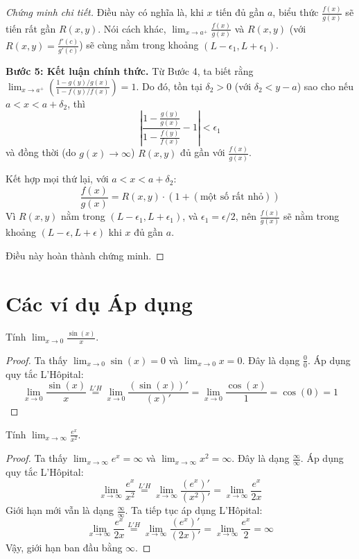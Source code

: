 \begin{proof}[Chứng minh chi tiết]
Điều này có nghĩa là, khi $x$ tiến đủ gần $a$, biểu thức $\frac{f(x)}{g(x)}$ sẽ tiến rất gần $R(x, y)$.
Nói cách khác, $\lim_{x \to a^+} \frac{f(x)}{g(x)}$ và $R(x, y)$ (với $R(x, y) = \frac{f'(c)}{g'(c)}$) sẽ cùng nằm trong khoảng $(L - \epsilon_1, L + \epsilon_1)$.

\textbf{Bước 5: Kết luận chính thức.}
Từ Bước 4, ta biết rằng $\lim_{x \to a^+} \left( \frac{1 - g(y)/g(x)}{1 - f(y)/f(x)} \right) = 1$.
Do đó, tồn tại $\delta_2 > 0$ (với $\delta_2 < y - a$) sao cho nếu $a < x < a + \delta_2$, thì
$$ \left| \frac{1 - \frac{g(y)}{g(x)}}{1 - \frac{f(y)}{f(x)}} - 1 \right| < \epsilon_1 $$
và đồng thời (do $g(x) \to \infty$) $R(x, y)$ đủ gần với $\frac{f(x)}{g(x)}$.

Kết hợp mọi thứ lại, với $a < x < a + \delta_2$:
$$ \frac{f(x)}{g(x)} = R(x, y) \cdot \left( 1 + (\text{một số rất nhỏ}) \right) $$
Vì $R(x, y)$ nằm trong $(L - \epsilon_1, L + \epsilon_1)$, và $\epsilon_1 = \epsilon/2$, nên $\frac{f(x)}{g(x)}$ sẽ nằm trong khoảng $(L - \epsilon, L + \epsilon)$ khi $x$ đủ gần $a$.

Điều này hoàn thành chứng minh.
\end{proof}

\section{Các ví dụ Áp dụng}

\begin{example}
Tính $\lim_{x \to 0} \frac{\sin(x)}{x}$.
\begin{proof}
Ta thấy $\lim_{x \to 0} \sin(x) = 0$ và $\lim_{x \to 0} x = 0$. Đây là dạng $\frac{0}{0}$.
Áp dụng quy tắc L'Hôpital:
$$ \lim_{x \to 0} \frac{\sin(x)}{x} \overset{L'H}{=} \lim_{x \to 0} \frac{(\sin(x))'}{(x)'} = \lim_{x \to 0} \frac{\cos(x)}{1} = \cos(0) = 1 $$
\end{proof}
\end{example}

\begin{example}
Tính $\lim_{x \to \infty} \frac{e^x}{x^2}$.
\begin{proof}
Ta thấy $\lim_{x \to \infty} e^x = \infty$ và $\lim_{x \to \infty} x^2 = \infty$. Đây là dạng $\frac{\infty}{\infty}$.
Áp dụng quy tắc L'Hôpital:
$$ \lim_{x \to \infty} \frac{e^x}{x^2} \overset{L'H}{=} \lim_{x \to \infty} \frac{(e^x)'}{(x^2)'} = \lim_{x \to \infty} \frac{e^x}{2x} $$
Giới hạn mới vẫn là dạng $\frac{\infty}{\infty}$. Ta tiếp tục áp dụng L'Hôpital:
$$ \lim_{x \to \infty} \frac{e^x}{2x} \overset{L'H}{=} \lim_{x \to \infty} \frac{(e^x)'}{(2x)'} = \lim_{x \to \infty} \frac{e^x}{2} = \infty $$
Vậy, giới hạn ban đầu bằng $\infty$.
\end{proof}
\end{example}

